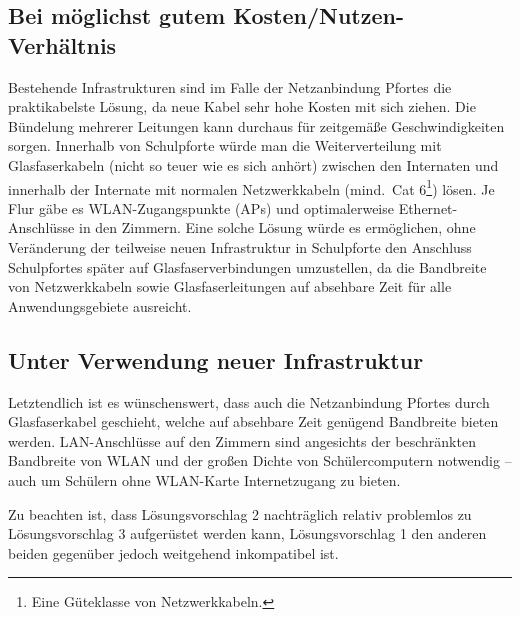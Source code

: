 \documentclass[10pt,a4paper,notitlepage]{scrartcl}
\begin{document}
\subsection{Bei möglichst gutem Kosten/Nutzen-Verhältnis}
\begin{multicols}{2}
Bestehende Infrastrukturen sind im Falle der Netzanbindung Pfortes die praktikabelste Lösung, da neue Kabel sehr hohe Kosten mit sich ziehen. Die Bündelung mehrerer Leitungen kann durchaus für zeitgemäße Geschwindigkeiten sorgen. Innerhalb von Schulpforte würde man die Weiterverteilung mit Glasfaserkabeln (nicht so teuer wie es sich anhört) zwischen den Internaten und innerhalb der Internate mit normalen Netzwerkkabeln (mind.\ Cat 6\footnote{Eine Güteklasse von Netzwerkkabeln.}) lösen. Je Flur gäbe es WLAN-Zugangspunkte (APs) und optimalerweise Ethernet-Anschlüsse in den Zimmern. Eine solche Lösung würde es ermöglichen, ohne Veränderung der teilweise neuen Infrastruktur in Schulpforte den Anschluss Schulpfortes später auf Glasfaserverbindungen umzustellen, da die Bandbreite von Netzwerkkabeln sowie Glasfaserleitungen auf absehbare Zeit für alle Anwendungsgebiete ausreicht.
\end{multicols}
\subsection{Unter Verwendung neuer Infrastruktur}
\begin{multicols}{2}
Letztendlich ist es wünschenswert, dass auch die Netzanbindung Pfortes durch Glasfaserkabel geschieht, welche auf absehbare Zeit genügend Bandbreite bieten werden. LAN-Anschlüsse auf den Zimmern sind angesichts der beschränkten Bandbreite von WLAN und der großen Dichte von Schülercomputern notwendig -- auch um Schülern ohne WLAN-Karte Internetzugang zu bieten.

Zu beachten ist, dass Lösungsvorschlag 2 nachträglich relativ problemlos zu Lösungsvorschlag 3 aufgerüstet werden kann, Lösungsvorschlag 1 den anderen beiden gegenüber jedoch weitgehend inkompatibel ist.
\end{multicols}
\end{document}
